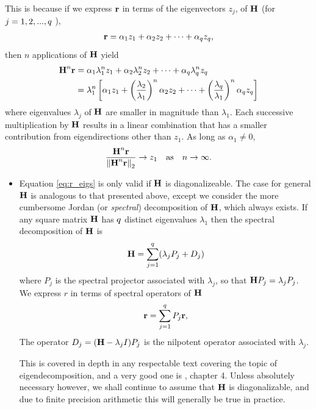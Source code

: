 This is because if we express $\Rr$ in terms of the eigenvectors $z_j$, of $\H$ (for  $j=1,2,...,\npol$ ), 
\begin{align}
\Rr &= \alpha_1 z_1 + \alpha_2 z_2 + \cdots + \alpha_\npol z_\npol,\\
\label{eq:r_eigs}
\end{align}
then $n$  applications of  $\H$ yield
\begin{align*}
\H^n \Rr &= \alpha_1 \lambda^n_1 z_1 + \alpha_2 \lambda^n_2 z_2 + \cdots + \alpha_\npol \lambda^n_\npol z_\npol\\
  &= \lambda_1^n \left[ \alpha_1 z_1 + \left( \frac{\lambda_2}{\lambda_1} \right)^n \alpha_2 z_2 + \cdots + \left( \frac{\lambda_q}{\lambda_1} \right)^n \alpha_\npol z_\npol \right]
\end{align*}
where eigenvalues $\lambda_j$ of $\H$ are smaller in magnitude than $\lambda_1$.  Each successive multiplication by $\H$ results in a linear combination that has a smaller contribution from eigendirections other than $z_1$.  As long as $\alpha_1\neq 0$,
\[
\frac{\H^n \Rr}{\nrm{2}{\H^n \Rr}} \rightarrow z_1 \quad \text{as} \quad n\rightarrow \infty. 
\]
  



\begin{itemize}
\item Equation \eqref{eq:r_eigs} is only valid if $\H$ is diagonalizeable.  
 The case for general $\H$ is analogous to that presented above, except we consider the more cumbersome Jordan (or \emph{spectral}) decomposition of $\H$,  which always exists. If any square matrix $\H$ has $\npol$ distinct eigenvalues $\lambda_1$ then the spectral decomposition of $\H$ is
\begin{equation}
\H = \sum_{j=1}^\npol(\lambda_j P_j + D_j)
\label{eq:spectral_decomp}
\end{equation}
where $P_j$ is the spectral projector associated with $\lambda_j$, so that $\H P_j = \lambda_j P_j$.   We express $r$ in terms of spectral operators of $\H$
\[
\Rr = \sum_{j=1}^\npol P_j \Rr,      
\]
The operator $D_j=(\H-\lambda_j I)P_j$ is the nilpotent operator associated with $\lambda_j$.  

This is covered in depth in any respectable text covering the topic of eigendecomposition, and a very good one is \cite{saad2011}, chapter 4.  Unless absolutely necessary however, we shall continue to assume that $\H$ is diagonalizable, and due to finite precision arithmetic this will generally be true in practice.
\end{itemize}

